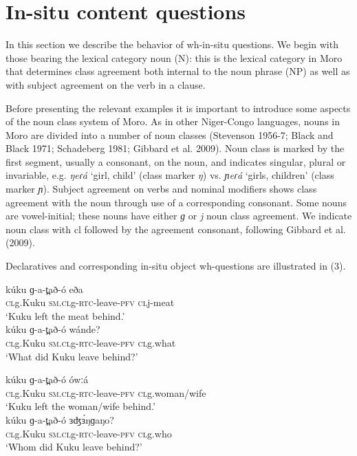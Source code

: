 \section{In-situ content questions}

In this section we describe the behavior of wh-in-situ questions. We begin with those bearing the lexical category noun (N): this is the lexical category in Moro that determines class agreement both internal to the noun phrase (NP) as well as with subject agreement on the verb in a clause.  

Before presenting the relevant examples it is important to introduce some aspects of the noun class system of Moro. As in other Niger-Congo languages, nouns in Moro are divided into a number of noun classes (Stevenson 1956-7; Black and Black 1971; Schadeberg 1981; Gibbard et al. 2009). Noun class is marked by the first segment, usually a consonant, on the noun, and indicates singular, plural or invariable, e.g. \textit{ŋeɾá} ‘girl, child’ (class marker \textit{ŋ}) vs. \textit{ɲeɾá} ‘girls, children’ (class marker \textit{ɲ}). Subject agreement on verbs and nominal modifiers shows class agreement with the noun through use of a corresponding consonant. Some nouns are vowel-initial; these nouns have either \textit{ɡ} or \textit{j} noun class agreement. We indicate noun class with cl followed by the agreement consonant, following Gibbard et al. (2009). 

Declaratives and corresponding in-situ object wh-questions are illustrated in (3).

\ea
\ea \gll	kúku	ɡ-a-t̪að-ó	eða\\
	\textsc{cl}g.Kuku	\textsc{sm.cl}g-\textsc{rtc}-leave-\textsc{pfv}	\textsc{cl}j-meat   \\  			     
\trans	‘Kuku left the meat behind.’\\
\ex \gll	kúku	ɡ-a-t̪að-ó	wánde?\\
	\textsc{cl}g.Kuku	\textsc{sm.cl}g-\textsc{rtc}-leave-\textsc{pfv}	\textsc{cl}g.what\\
\trans	‘What did Kuku leave behind?’	\\
\z
\z

\ea
\ea \gll	kúku	ɡ-a-t̪að-ó	ówːá     \\
	\textsc{cl}g.Kuku	\textsc{sm.cl}g-\textsc{rtc}-leave-\textsc{pfv}	\textsc{cl}g.woman/wife\\
\trans	‘Kuku left the woman/wife behind.’\\
\ex \gll	kúku		ɡ-a-t̪að-ó             	ɜʤɜ́ŋɡaŋo?	\\
		\textsc{cl}g.Kuku	\textsc{sm.cl}g-\textsc{rtc}-leave-\textsc{pfv}	\textsc{cl}g.who\\
\trans		‘Whom did Kuku leave behind?’\\
\z
\z

